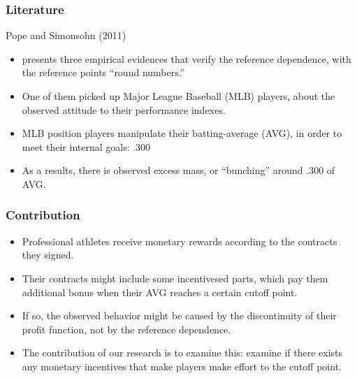 \documentclass[dvipdfmx,12pt]{beamer}
\begin{document}
\begin{frame}\frametitle{Literature}
  Pope and Simonsohn (2011)
  \begin{itemize}
    \item presents three empirical evidences that verify the reference dependence, with the reference points ``round numbers.''

    \item One of them picked up Major League Baseball (MLB) players, about the observed attitude to their performance indexes.

    \item MLB position players manipulate their batting-average (AVG), in order to meet their internal goals: .300

    \item As a results, there is observed excess mass, or ``bunching'' around .300 of AVG.
  \end{itemize}
\end{frame}

\begin{frame}\frametitle{Contribution}
\begin{itemize}
  \item Professional athletes receive monetary rewards according to the contracts they signed.

  \item Their contracts might include some incentivesed parts, which pay them additional bonus when their AVG reaches a certain cutoff point.

  \item If so, the observed behavior might be caused by the discontinuity of their profit function, not by the reference dependence.

  \item The contribution of our research is to examine this: examine if there exists any monetary incentives that make players make effort to the cutoff point.
\end{itemize}
\end{frame}
\end{document}
